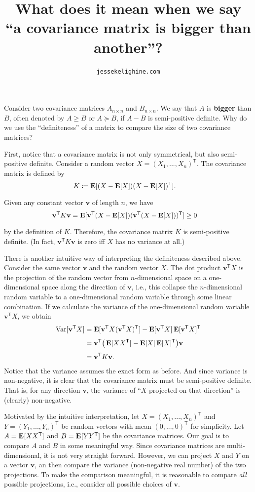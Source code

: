 \documentclass{article}
\title{What does it mean when we say\\``a covariance matrix is \textbf{bigger} than another''?}
\author{\texttt{jessekelighine.com}}
\DeclareMathOperator{\Exp}{\text{\textbf{E}}}
\DeclareMathOperator{\Var}{\text{Var}}
\newcommand{\E}[2][]{\Exp_{#1}[#2]}
\newcommand{\var}[2][]{\Var_{#1}[#2]}
\newcommand{\T}{^{\mathsf{T}}}
\newcommand{\vv}{\mathbf{v}}
\begin{document}
\maketitle

\begin{multicols}{2}

\noindent
Consider two covariance matrices $A_{n\times n}$ and $B_{n\times n}$.
We say that $A$ is \textbf{bigger} than $B$,
often denoted by $A\geq B$ or $A\succeq B$, if $A-B$ is semi-positive definite.
Why do we use the ``definiteness'' of a matrix to compare the size of two covariance matrices?

First, notice that a covariance matrix is not only symmetrical, but also
semi-positive definite.  Consider a random vector $X=(X_1,...,X_n)\T$.
The covariance matrix is defined by
\begin{align*}
	K &\coloneqq \E{(X-\E{X})(X-\E{X})\T}.
\end{align*}
Given any constant vector $\vv$ of length $n$, we have
\begin{align*}
	\vv\T K \vv &= \E{\vv\T(X-\E{X})(\vv\T(X-\E{X}))\T} \geq 0
\end{align*}
by the definition of $K$.
Therefore, the covariance matrix $K$ is semi-positive definite.
(In fact, $\vv\T K\vv$ is zero iff $X$ has no variance at all.)

There is another intuitive way of interpreting the definiteness described above.
Consider the same vector $\vv$ and the random vector $X$.
The dot product $\vv\T X$ is the projection of the random vector from $n$-dimensional
space on a one-dimensional space along the direction of $\vv$, i.e.,
this collapse the $n$-dimensional random variable to a one-dimensional random variable through some linear combination.
If we calculate the variance of the one-dimensional random variable $\vv\T X$, we obtain
\begin{align*}
	\var{\vv\T X}
	&= \E{\vv\T X(\vv\T X)\T } - \E{\vv\T X}\E{\vv\T X}\T  \\
	&= \vv\T \big(\E{XX\T } - \E{X}\E{X}\T \big)\vv \\
	&= \vv\T K\vv.
\end{align*}
Notice that the variance assumes the exact form as before.
And since variance is non-negative, it is clear that the covariance matrix must be semi-positive definite.
That is, for any direction $\vv$,
the variance of ``$X$ projected on that direction'' is (clearly) non-negative.

Motivated by the intuitive interpretation,
let $X=(X_1,...,X_n)\T$ and $Y=(Y_1,...,Y_n)\T$ be random vectors with mean $(0,...,0)\T$ for simplicity.
Let $A=\E{XX\T}$ and $B=\E{YY\T}$ be the covariance matrices.
Our goal is to compare $A$ and $B$ in some meaningful way.
Since covariance matrices are multi-dimensional, it is not very straight forward.
However, we can project $X$ and $Y$ on a vector $\vv$,
an then compare the variance (non-negative real number) of the two projections.
To make the comparison meaningful,
it is reasonable to compare \emph{all} possible projections,
i.e., consider all possible choices of $\vv$.


\end{multicols}
\end{document}
